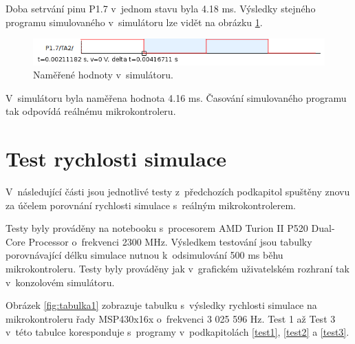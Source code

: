 Doba setrvání pinu P1.7 v~jednom stavu byla 4.18 ms. Výsledky stejného programu simulovaného v~simulátoru lze vidět na obrázku \ref{fig:dso06sim}.

\begin{figure}[ht]
\centering
\includegraphics[trim=0cm 0cm 0cm 0cm, scale=0.8]{fig/dso06sim}
\caption{Naměřené hodnoty v~simulátoru.}
\label{fig:dso06sim}
\end{figure}

V~simulátoru byla naměřena hodnota 4.16 ms. Časování simulovaného programu tak odpovídá reálnému mikrokontroleru.

\section{Test rychlosti simulace}

V~následující části jsou jednotlivé testy z~předchozích podkapitol spuštěny znovu za účelem porovnání rychlosti simulace s~reálným mikrokontrolerem.

Testy byly prováděny na notebooku s~procesorem AMD Turion II P520 Dual-Core Processor o~frekvenci 2300 MHz. Výsledkem testování jsou tabulky porovnávající délku simulace nutnou k~odsimulování 500 ms běhu mikrokontroleru. Testy byly prováděny jak v~grafickém uživatelském rozhraní tak v~konzolovém simulátoru.

Obrázek \ref{fig:tabulka1} zobrazuje tabulku s~výsledky rychlosti simulace na mikrokontroleru řady MSP430x16x o~frekvenci 3 025 596 Hz. Test 1 až Test 3 v~této tabulce koresponduje s~programy v~podkapitolách \ref{test1}, \ref{test2} a \ref{test3}.

